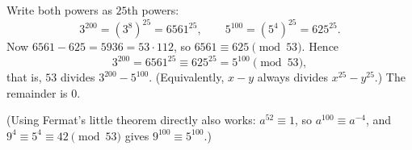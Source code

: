 Write both powers as $25$th powers:
\[
3^{200}=\left(3^{8}\right)^{25}=6561^{25},\qquad 5^{100}=\left(5^{4}\right)^{25}=625^{25}.
\]
Now $6561-625=5936=53\cdot112$, so $6561\equiv625\pmod{53}$. Hence
\[
3^{200}=6561^{25}\equiv625^{25}=5^{100}\pmod{53},
\]
that is, $53$ divides $3^{200}-5^{100}$. (Equivalently, $x-y$ always divides $x^{25}-y^{25}$.) The remainder is $\boxed{0}$.

(Using Fermat's little theorem directly also works: $a^{52}\equiv1$, so $a^{100}\equiv a^{-4}$, and $9^{4}\equiv5^{4}\equiv42\pmod{53}$ gives $9^{100}\equiv5^{100}$.)
